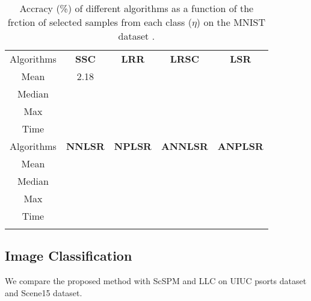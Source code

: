 \documentclass[10pt,twocolumn,letterpaper]{article}
\renewcommand{\huge}{\fontsize{8.6pt}{\baselineskip}\selectfont}
\begin{document}
\begin{table}[hbp]
\caption{Accracy (\%) of different algorithms as a function of the frction of selected samples from each class ($\eta$) on the MNIST dataset \cite{mnist}.}
\label{t3}
\vspace{-4mm}
\begin{center}
\renewcommand\arraystretch{1}
\scriptsize
\begin{tabular}{ccccc}
\Xhline{0.5pt}
Algorithms
&
\textbf{SSC}\cite{ssc}
&
\textbf{LRR}\cite{lrr}
&
\textbf{LRSC}\cite{lrsc}
&
\textbf{LSR}\cite{lsr}
\\
\Xhline{1.2pt}
Mean & 2.18 &  &  &  
\\
\Xhline{0.5pt}
Median &  &  &  &  
\\
\Xhline{0.5pt}
Max &  &  &  &  
\\
\Xhline{0.5pt}
Time &  &  &  &  
\\
\Xhline{0.5pt}
Algorithms
&
\textbf{NNLSR}
&
\textbf{NPLSR}
&
\textbf{ANNLSR}
&
\textbf{ANPLSR}
\\
\Xhline{1.2pt}
Mean &  &  &  &  
\\
\Xhline{0.5pt}
Median &  &  &  &  
\\
\Xhline{0.5pt}
Max &  &  &  &  
\\
\Xhline{0.5pt}
Time &  &  &  &  
\\
\Xhline{0.5pt} 
\end{tabular}
\end{center}
\vspace{-3mm}
\end{table}

\subsection{Image Classification}
We compare the proposed method with ScSPM \cite{} and LLC \cite{} on UIUC psorts dataset \cite{} and Scene15 \cite{} dataset. 
\end{document}

